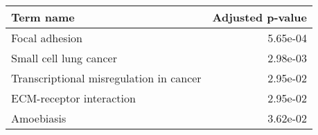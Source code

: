 \begin{tabular}{lr}
\toprule
                              Term name &  Adjusted p-value \\
\midrule
                         Focal adhesion &          5.65e-04 \\
                 Small cell lung cancer &          2.98e-03 \\
Transcriptional misregulation in cancer &          2.95e-02 \\
               ECM-receptor interaction &          2.95e-02 \\
                             Amoebiasis &          3.62e-02 \\
\bottomrule
\end{tabular}
